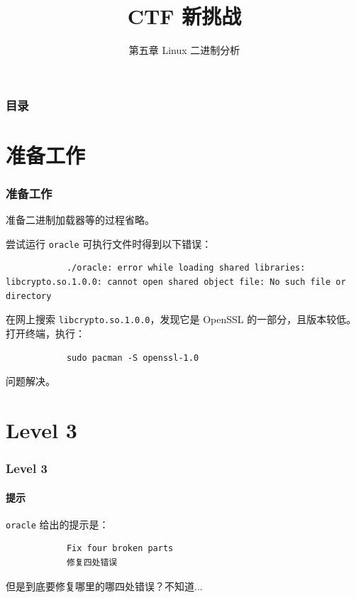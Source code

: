 \documentclass{ctexbeamer}
\author{\theauthor}
\institute[\theshortinst]{\theinst}
\title{CTF 新挑战}
\subtitle{第五章 Linux 二进制分析}
\begin{document}
    \begin{frame}
        \titlepage
    \end{frame}

    \begin{frame}
        \frametitle{目录}
        \tableofcontents
    \end{frame}

    \section{准备工作}
    \begin{frame}[fragile]
        \frametitle{准备工作}
    
        准备二进制加载器等的过程省略。\pause

        尝试运行 \texttt{oracle} 可执行文件时得到以下错误：

        \begin{verbatim}
            ./oracle: error while loading shared libraries: libcrypto.so.1.0.0: cannot open shared object file: No such file or directory
        \end{verbatim}
        \pause
        在网上搜索 \texttt{libcrypto.so.1.0.0}，发现它是 OpenSSL 的一部分，且版本较低。打开终端，执行：

        \begin{verbatim}
            sudo pacman -S openssl-1.0
        \end{verbatim}

        问题解决。
    
    \end{frame}

    \section{Level 3}

    \begin{frame}[fragile]
        \frametitle{Level 3}
        \framesubtitle{提示}
    
        \texttt{oracle} 给出的提示是：\pause

        \begin{verbatim}
            Fix four broken parts
            修复四处错误
        \end{verbatim}

        \pause
        但是到底要修复哪里的哪四处错误？不知道...
    
    \end{frame}
\end{document}
